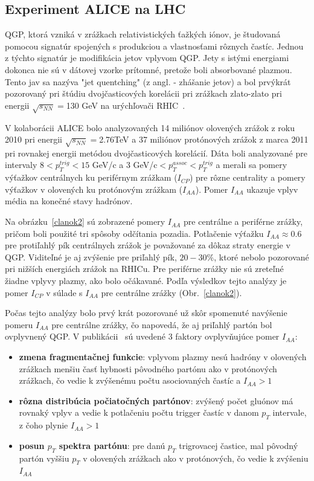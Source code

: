 \documentclass[thesismargins, thesislinespacing]{rnthesis}
\begin{document}
\subsection{Experiment ALICE na LHC}
QGP, ktorá vzniká v zrážkach relativistických ťažkých iónov, je študovaná pomocou signatúr spojených s produkciou a vlastnosťami rôznych častíc. Jednou z týchto signatúr je modifikácia jetov vplyvom QGP. Jety s istými energiami dokonca nie sú v dátovej vzorke prítomné, pretože boli absorbované plazmou. Tento jav sa nazýva "jet quentching" (z angl. - zhášanie jetov) a bol prvýkrát pozorovaný pri štúdiu dvoj\-čas\-ti\-co\-vých korelácii pri zrážkach zlato-zlato pri energii $\sqrt{s_{NN}}=$130 GeV na urýchľovači RHIC~\cite{rhic}.

V kolaborácii ALICE bolo analyzovaných 14 miliónov olovených zrážok z roku 2010 pri energii $\sqrt{s_{NN}}=$2.76TeV a 37 miliónov protónových zrážok z marca 2011 pri rovnakej energii metódou dvojčasticových korelácií. Dáta boli analyzované pre intervaly $8<p^{trig}_{T}<15$ GeV/c a 3 GeV/c$<p^{assoc}_{T}<p_T^{trig}$ a merali sa pomery výťažkov centrálnych ku periférnym zrážkam ($I_{CP}$) pre rôzne centrality a pomery výťažkov v olovených ku protónovým zrážkam ($I_{AA}$). Pomer $I_{AA}$ ukazuje vplyv média na konečné stavy hadrónov. 

Na obrázku~\ref{clanok2} sú zobrazené pomery $I_{AA}$ pre centrálne a periférne zrážky, pričom boli použité tri spôsoby odčítania pozadia. Potlačenie výťažku $I_{AA}\approx0.6$ pre protiľahlý pík centrálnych zrážok je považované za dôkaz straty energie v QGP. Viditeľné je aj zvýšenie pre priľahlý pík, $20-30\%$, ktoré nebolo pozorované pri nižších energiách zrážok na RHICu. Pre periférne zrážky nie sú zreteľné žiadne vplyvy plazmy, ako bolo očákavané. Podľa výsledkov tejto analýzy je pomer $I_{CP}$ v súlade s $I_{AA}$ pre centrálne zrážky (Obr.~\ref{clanok2}).



Počas tejto analýzy bolo prvý krát pozorované už skôr spomenuté navýšenie pomeru $I_{AA}$ pre centrálne zrážky, čo napovedá, že aj priľahlý partón bol ovplyvnený QGP. V publikácii~\cite{clanok} sú uvedené 3 faktory ovplyvňujúce pomer $I_{AA}$:
\begin{itemize}
	\item \textbf{zmena fragmentačnej funkcie}: vplyvom plazmy nesú hadróny v olovených zrážkach menšiu časť hybnosti pôvodného partónu ako v protónových zrážkach, čo vedie k zvýšenému počtu asociovaných častíc a $I_{AA}>1$
	\item \textbf{rôzna distribúcia počiatočných partónov}: zvýšený počet gluónov má rovnaký vplyv a vedie k potlačeniu počtu trigger častíc v danom $p_T$ intervale, z čoho plynie $I_{AA}>1$
	\item \textbf{posun $p_T$ spektra partónu}: pre danú $p_T$ trigrovacej častice, mal pôvodný partón vyššiu $p_T$ v olovených zrážkach ako v protónových, čo vedie k zvýšeniu $I_{AA}$
\end{itemize}
\end{document}
